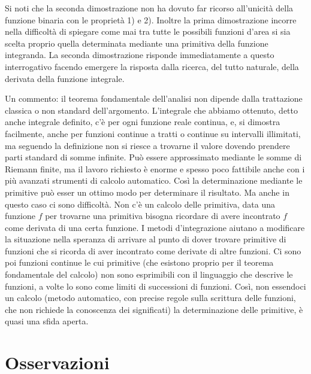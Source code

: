  Si noti che la seconda dimostrazione non ha dovuto far ricorso all'unicità 
della funzione binaria con le proprietà 1) e 2). Inoltre la prima 
dimostrazione incorre nella difficoltà di spiegare come mai tra tutte le 
possibili funzioni d'area si sia scelta proprio quella determinata mediante 
una primitiva della funzione integranda. La seconda dimostrazione risponde 
immediatamente a questo interrogativo facendo emergere la risposta dalla 
ricerca, del tutto naturale, della derivata della funzione integrale.

Un commento: il teorema fondamentale dell'analisi non dipende dalla 
trattazione classica o non standard dell'argomento. L'integrale che abbiamo 
ottenuto, detto anche integrale definito, c'è per ogni funzione reale 
continua, e, si dimo­stra facilmente, anche per funzioni continue a tratti o 
continue su intervalli illimitati, ma seguendo la definizione non si riesce a 
trovarne il valore dovendo prendere parti standard di somme infinite. Può 
essere approssimato mediante le somme di Riemann finite, ma il lavoro 
richiesto è enorme e spesso poco fattibile anche con i più avanzati strumenti 
di calcolo automatico. 
Così la determinazione mediante le primitive può esser un ottimo modo per 
determinare il risultato. Ma anche in questo caso ci sono difficoltà. Non c'è 
un calcolo delle primitiva, data una funzione \(f\) per trovarne una 
primitiva 
bisogna ricordare di avere incontrato \(f\) come derivata di una certa 
funzione. 
I metodi d'integrazione aiutano a modificare la situazione nella speranza di 
arrivare al punto di dover trovare primitive di funzioni che si ricorda di 
aver incontrato come derivate di altre funzioni. Ci sono poi funzioni 
continue le cui primitive (che esistono proprio per il teorema fondamentale 
del calcolo) non sono esprimibili con il linguaggio che descrive le 
funzioni, a volte lo sono come limiti di successioni di funzioni. Così, non 
essendoci un calcolo (metodo automatico, con precise regole sulla scrittura 
delle funzioni, che non richiede la conoscenza dei significati) la 
determinazione delle primitive, è quasi una sfida aperta.

\section{Osservazioni}

